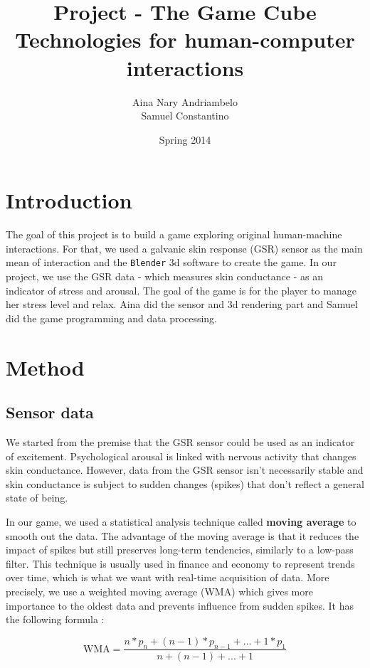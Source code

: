\documentclass[12pt,a4paper]{article}
\title{\LARGE \textbf{Project - The Game Cube\textregistered}\\
	\bigskip
	\bigskip
	\large Technologies for human-computer interactions}
\author{Aina Nary Andriambelo \\ Samuel Constantino}
\date{Spring 2014}
\begin{document}
	\maketitle


\section{Introduction}

The goal of this project is to build a game exploring original human-machine interactions. For that, we used a galvanic skin response (GSR) sensor as the main mean of interaction and the \texttt{Blender} 3d software to create the game. In our project, we use the GSR data - which measures skin conductance - as an indicator of stress and arousal. The goal of the game is for the player to manage her stress level and relax. Aina did the sensor and 3d rendering part and Samuel did the game programming and data processing.

\section{Method}

\subsection{Sensor data}

We started from the premise that the GSR sensor could be used as an indicator of excitement. Psychological arousal is linked with nervous activity that changes skin conductance. However, data from the GSR sensor isn't necessarily stable and skin conductance is subject to sudden changes (spikes) that don't reflect a general state of being.

In our game, we used a statistical analysis technique called \textbf{moving average} to smooth out the data. The advantage of the moving average is that it reduces the impact of spikes but still preserves long-term tendencies, similarly to a low-pass filter. This technique is usually used in finance and economy to represent trends over time, which is what we want with real-time acquisition of data. More precisely, we use a weighted moving average (WMA) which gives more importance to the oldest data and prevents influence from sudden spikes. It has the following formula : 

\begin{equation}
\text{WMA} = \frac{n * p_n + (n - 1) * p_{n-1} + ... + 1 * p_{1}}{n + (n-1) + ... + 1}
\end{equation}
\end{document}
